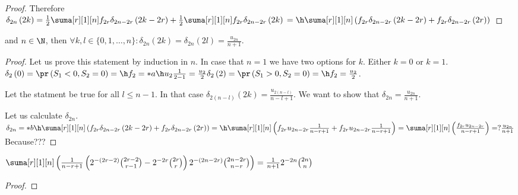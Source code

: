 \begin{proof}
  Therefore $\delta_{2n} \left(2k \right)
  =\frac{1}{2}\suma[r][1][n] f_{2r}\delta_{2n-2r} \left( 2k-2r\right)+\frac{1}{2}\suma[r][1][n] f_{2r}\delta_{2n-2r} \left( 2k \right)\\
  =\h \suma[r][1][n]\left( f_{2r} \delta_{2n-2r}\left(2k-2r\right)+f_{2r} \delta_{2n-2r}\left( 2r \right)\right)$
\end{proof}
\begin{thm}
  \Lrws  and $n \in \N$, then
  $\forall k,l \in \{0,1, \ldots, n \}:\delta_{2n}\left( 2k \right)=\delta_{2n}\left( 2l \right)=\frac{u_{2n}}{n+1}.$
\end{thm}
\begin{proof}
  Let us prove this statement by induction in $n$. In case that $n=1$ we have two options for $k$. Either $k=0$ or $k=1$.
  $\delta_2\left(0 \right)=\pr\left( S_1<0, S_2=0\right)=\h f_2=*a
  \h u_2\frac{1}{2-1}=\frac{u_2}{2}
  \delta_2 \left( 2\right)=\pr \left( S_1>0, S_2=0\right)=\h f_2=\frac{u_2}{2}$.

  Let the statment be true for all $l\leq n-1$. In that case $\delta_{2(n-l)}\left( 2k \right)=\frac{u_{2(n-l)}}{n-l+1}$.
  We want to show that $\delta_{2n}=\frac{u_{2n}}{n+1}$.

  Let us calculate $\delta_{2n}$. $\delta_{2n}=*b
  \h \suma[r][1][n]\left( f_{2r} \delta_{2n-2r}\left(2k-2r\right)+f_{2r} \delta_{2n-2r}\left( 2r \right)\right)=
  \h \suma[r][1][n]\left( f_{2r} u_{2n-2r}\frac{1}{n-r+1}+f_{2r}u_{2n-2r}\frac{1}{n-r+1}\right)
  =\suma[r][1][n]\left( \frac{f_{2r} u_{2n-2r}}{n-r+1}\right)
  =?\frac{u_{2n}}{n+1}$ Because???

\end{proof}
\begin{lemma}
  $\suma[r][1][n]\left( \frac{1}{n-r+1}\left( 2^{-(2r-2)}\binom{2r-2}{r-1}-2^{-2r}\binom{2r}{r}\right)2^{-(2n-2r)}\binom{2n-2r}{n-r}\right)
  =\frac{1}{n+1}2^{-2n}\binom{2n}{n}$
\end{lemma}
\begin{proof}

\end{proof}
